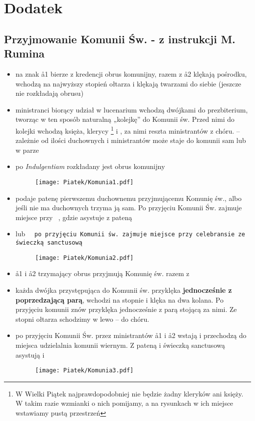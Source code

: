 \section{Dodatek}
  \subsection{Przyjmowanie Komunii Św. - z instrukcji M. Rumina}
  \label{komunia}

    \begin{itemize}
      \item na znak  \aa1 bierze z kredencji obrus komunijny, razem z \aa2 klękają pośrodku, wchodzą na najwyższy stopień ołtarza i klękają twarzami do siebie (jeszcze nie rozkładają obrusu)
      \item ministranci biorący udział w lucenarium wchodzą dwójkami do prezbiterium, tworząc w ten sposób naturalną „kolejkę” do Komunii św. Przed nimi do kolejki wchodzą księża, klerycy  \footnote{W Wielki Piątek najprawdopodobniej nie będzie żadny kleryków ani księży. W takim razie wzmianki o nich pomijamy, a na rysunkach w ich miejsce wstawiamy pustą przestrzeń} i , za nimi reszta ministrantów z chóru.  – zależnie od ilości duchownych i ministrantów może staje do komunii sam lub w parze
      \item po \textit{Indulgentiam} rozkładany jest obrus komunijny 
      
      \begin{figure}[h]
      \centering
	  \texttt{[image: Piatek/Komunia1.pdf]}
      \end{figure}
    
      \item {} podaje patenę pierwszemu duchownemu przyjmującemu Komunię św., albo jeśli nie ma duchownych trzyma ją sam. Po przyjęciu Komunii Św. zajmuje miejsce przy \ii~, gdzie asystuje z pateną
      \item {} lub \tt~ po przyjęciu Komunii św. zajmuje miejsce przy celebransie ze świeczką sanctusową
    
      \begin{figure}[h]
      \centering
	  \texttt{[image: Piatek/Komunia2.pdf]}
      \end{figure}
      
      \item \aa1 i \aa2 trzymający obrus przyjmują Komunię św. razem z 
      \item każda dwójka przystępująca do Komunii św. przyklęka \textbf{jednocześnie z poprzedzającą parą}, wchodzi na stopnie i klęka na dwa kolana. Po przyjęciu komunii znów przyklęka jednocześnie z parą stojącą za nimi. Ze stopni ołtarza schodzimy w lewo – do chóru.
      \item po przyjęciu Komunii Św. przez ministrantów \aa1 i \aa2 wstają i przechodzą do miejsca udzielalnia komunii wiernym. Z pateną i świeczką sanctusową asystują  i 
      
      \begin{figure}[h]
      \centering
	  \texttt{[image: Piatek/Komunia3.pdf]}
      \end{figure}
    
    \end{itemize}
    
